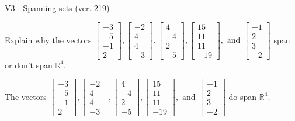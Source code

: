 \begin{exercise}
  \begin{exerciseTitle}V3 - Spanning sets (ver. 219)\end{exerciseTitle}
  \begin{exerciseStatement}
    Explain why the vectors \(\left[\begin{array}{r}
-3 \\
-5 \\
-1 \\
2
\end{array}\right] , \left[\begin{array}{r}
-2 \\
4 \\
4 \\
-3
\end{array}\right] , \left[\begin{array}{r}
4 \\
-4 \\
2 \\
-5
\end{array}\right] , \left[\begin{array}{r}
15 \\
11 \\
11 \\
-19
\end{array}\right] , \text{ and } \left[\begin{array}{r}
-1 \\
2 \\
3 \\
-2
\end{array}\right]\) span or don't span \(\mathbb{R}^4\). 
	


  \end{exerciseStatement}
  \begin{exerciseAnswer}
   The vectors \(\left[\begin{array}{r}
-3 \\
-5 \\
-1 \\
2
\end{array}\right] , \left[\begin{array}{r}
-2 \\
4 \\
4 \\
-3
\end{array}\right] , \left[\begin{array}{r}
4 \\
-4 \\
2 \\
-5
\end{array}\right] , \left[\begin{array}{r}
15 \\
11 \\
11 \\
-19
\end{array}\right] , \text{ and } \left[\begin{array}{r}
-1 \\
2 \\
3 \\
-2
\end{array}\right]\) 
  	 do  
	span \(\mathbb{R}^4\).
  



\end{exerciseAnswer}
\end{exercise}
